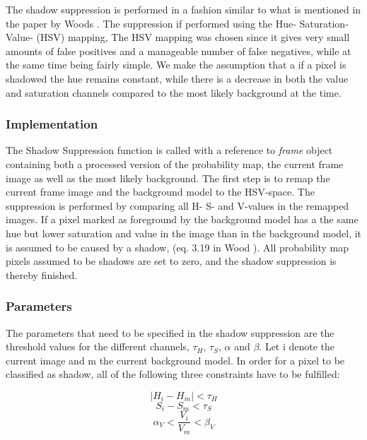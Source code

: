 The shadow suppression is performed in a fashion similar to what is mentioned in the paper by Woods \cite{Wood}. The suppression if performed using the Hue- Saturation- Value- (HSV) mapping, The HSV mapping was chosen since it gives very small amounts of false positives and a manageable number of false negatives, while at the same time being fairly simple. We make the assumption that a if a pixel is shadowed the hue remains constant, while there is a decrease in both the value and saturation channels compared to the most likely background at the time.


\subsubsection{Implementation}
The Shadow Suppression function is called with a reference to \emph{frame} object containing both a processed version of the probability map, the current frame image as well as the most likely background. The first step is to remap the current frame image and the background model to the HSV-space. The suppression is performed by comparing all H- S- and V-values in the remapped images. If a pixel marked as foreground by the background model has a the same hue but lower saturation and value in the image than in the background model, it is assumed to be caused by a shadow, (eq. 3.19 in Wood \cite{Wood}). All probability map pixels assumed to be shadows are set to zero, and the shadow suppression is thereby finished.

\subsubsection{Parameters}
The parameters that need to be specified in the shadow suppression are the threshold values for the different channels, $\tau_H$, $\tau_S$, $\alpha$ and $\beta$. Let i denote the current image and m the current background model. In order for a pixel to be classified as shadow, all of the following three constraints have to be fulfilled:

\begin{equation}
	|H_i - H_m| < \tau_H
	\label{eq:H}
\end{equation}
\begin{equation}
	S_i - S_m < \tau_S
	\label{eq:S}
\end{equation}
\begin{equation}
	\alpha_V < \frac{V_i}{V_m} < \beta_V
	\label{eq:V}
\end{equation}

